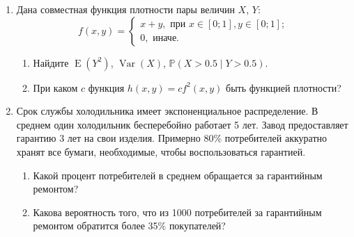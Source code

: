 \documentclass[12pt]{article}
\DeclareMathOperator{\Var}{Var}
\DeclareMathOperator{\E}{E}
\def \P{\mathbb{P}}
\begin{document}
\begin{enumerate}
  \item Дана совместная функция плотности пары величин $X$, $Y$:
  \[
    f(x, y) = \begin{cases} 
      x+ y, \text{ при } x\in [0;1], y\in [0;1]; \\
      0, \text{ иначе.}
    \end{cases}
  \]
\begin{enumerate}
  \item Найдите $\E(Y^2)$, $\Var(X)$, $\P(X > 0.5 \mid Y > 0.5)$.
  \item При каком $c$ функция $h(x, y) = c f^2(x, y)$ быть функцией плотности? 
\end{enumerate}


\item Срок службы холодильника имеет экспоненциальное распределение. В среднем один холодильник
бесперебойно работает 5 лет. Завод предоставляет гарантию 3 лет на свои изделия. 
Примерно 80\% потребителей аккуратно хранят все бумаги, необходимые, чтобы воспользоваться
гарантией.

\begin{enumerate}
  \item Какой процент потребителей в среднем обращается за гарантийным ремонтом?
  \item Какова вероятность того, что из 1000 потребителей за гарантийным ремонтом обратится более 35\%
покупателей?
\end{enumerate}

\end{enumerate}
\end{document}

